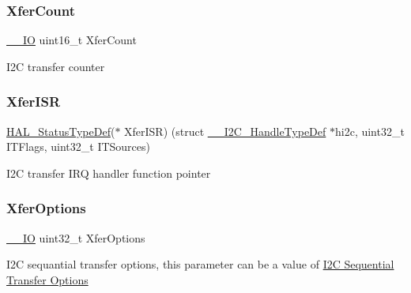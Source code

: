 \subsubsection{\texorpdfstring{Xfer\+Count}{XferCount}}
{\footnotesize\ttfamily \hyperlink{core__sc300_8h_aec43007d9998a0a0e01faede4133d6be}{\+\_\+\+\_\+\+IO} uint16\+\_\+t Xfer\+Count}

I2C transfer counter \mbox{\label{struct_____i2_c___handle_type_def_a5e03f08d05d15496797f071858ebed53}} 
\subsubsection{\texorpdfstring{Xfer\+I\+SR}{XferISR}}
{\footnotesize\ttfamily \hyperlink{stm32f0xx__hal__def_8h_a63c0679d1cb8b8c684fbb0632743478f}{H\+A\+L\+\_\+\+Status\+Type\+Def}($\ast$ Xfer\+I\+SR) (struct \hyperlink{struct_____i2_c___handle_type_def}{\+\_\+\+\_\+\+I2\+C\+\_\+\+Handle\+Type\+Def} $\ast$hi2c, uint32\+\_\+t I\+T\+Flags, uint32\+\_\+t I\+T\+Sources)}

I2C transfer I\+RQ handler function pointer \mbox{\label{struct_____i2_c___handle_type_def_a275aa3c8180a03dbe4bf55fafba3e892}} 
\subsubsection{\texorpdfstring{Xfer\+Options}{XferOptions}}
{\footnotesize\ttfamily \hyperlink{core__sc300_8h_aec43007d9998a0a0e01faede4133d6be}{\+\_\+\+\_\+\+IO} uint32\+\_\+t Xfer\+Options}

I2C sequantial transfer options, this parameter can be a value of \hyperlink{group___i2_c___x_f_e_r_o_p_t_i_o_n_s}{I2C Sequential Transfer Options} \mbox{\label{struct_____i2_c___handle_type_def_a51999331ab800faccdb97383b39819dd}} 
